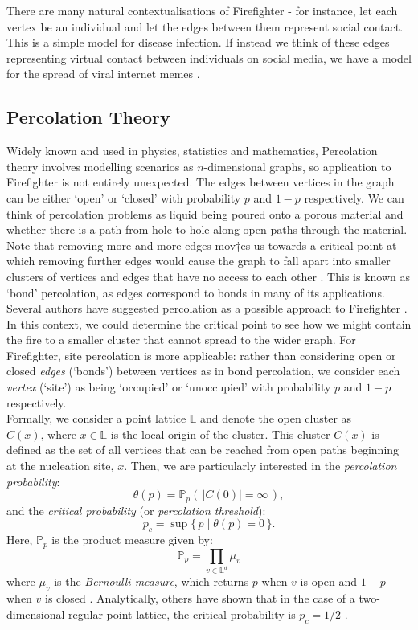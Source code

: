 \documentclass[11pt]{amsart}
\begin{document}
There are many natural contextualisations of Firefighter - for instance, let each vertex be an individual and let the edges between them represent social contact. This is a simple model for disease infection. If instead we think of these edges representing virtual contact between individuals on social media, we have a model for the spread of viral internet memes \cite{obrien19}.

\subsection{Percolation Theory}
\label{sec:perc}

Widely known and used in physics, statistics and mathematics, Percolation theory involves modelling scenarios as $n$-dimensional graphs, so application to Firefighter is not entirely unexpected. The edges between vertices in the graph can be either `open' or `closed' with probability $p$ and $1-p$ respectively. We can think of percolation problems as liquid being poured onto a porous material and whether there is a path from hole to hole along open paths through the material. Note that removing more and more edges mov†es us towards a critical point at which removing further edges would cause the graph to fall apart into smaller clusters of vertices and edges that have no access to each other \cite{grimmett99}. This is known as `bond' percolation, as edges correspond to bonds in many of its applications.\\

Several authors have suggested percolation as a possible approach to Firefighter \cite{finbow09}. In this context, we could determine the critical point to see how we might contain the fire to a smaller cluster that cannot spread to the wider graph. For Firefighter, site percolation is more applicable: rather than considering open or closed \emph{edges} (`bonds') between vertices as in bond percolation, we consider each \emph{vertex} (`site') as being `occupied' or `unoccupied' with probability $p$ and $1-p$ respectively.\\

Formally, we consider a point lattice $\mathbb{L}$ and denote the open cluster as $C(x)\text{,~where~}x\in\mathbb{L}$ is the local origin of the cluster. This cluster $C(x)$ is defined as the set of all vertices that can be reached from open paths beginning at the nucleation site, $x$. Then, we are particularly interested in the \emph{percolation probability}:
$$
\theta(p) = \mathbb{P}_p(\,|C(0)|=\infty\,),
$$
and the \emph{critical probability} (or \emph{percolation threshold}):
$$
p_c = \sup\{\,p \mid \theta(p)=0\,\}.
$$
Here, $\mathbb{P}_p$ is the product measure given by:
$$
\displaystyle \mathbb{P}_p=\prod_{v\in\mathbb{L}^d}\mu_v
$$
where $\mu_v$ is the \emph{Bernoulli measure}, which returns $p$ when $v$ is open and $1-p$ when $v$ is closed \cite[p. 28]{klenke14}. Analytically, others have shown that in the case of a two-dimensional regular point lattice, the critical probability is $p_c=1/2$ \cite{kersten80}.
\end{document}
